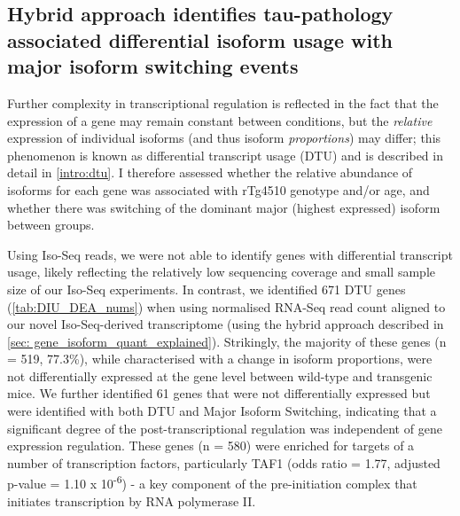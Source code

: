 \clearpage
\subsection{Hybrid approach identifies tau-pathology associated differential isoform usage with major isoform switching events}
Further complexity in transcriptional regulation is reflected in the fact that the expression of a gene may remain constant between conditions, but the \textit{relative} expression of individual isoforms (and thus isoform \textit{proportions}) may differ; this phenomenon is known as differential transcript usage (DTU) and is described in detail in \cref{intro:dtu}. I therefore assessed whether the relative abundance of isoforms for each gene was associated with rTg4510 genotype and/or age, and whether there was switching of the dominant major (highest expressed) isoform between groups. 

Using Iso-Seq reads, we were not able to identify genes with differential transcript usage, likely reflecting the relatively low sequencing coverage and small sample size of our Iso-Seq experiments. In contrast, we identified 671 DTU genes (\cref{tab:DIU_DEA_nums}) when using normalised RNA-Seq read count aligned to our novel Iso-Seq-derived transcriptome (using the hybrid approach described in \cref{sec: gene_isoform_quant_explained}). Strikingly, the majority of these genes (n = 519, 77.3\%), while characterised with a change in isoform proportions, were not differentially expressed at the gene level between wild-type and transgenic mice. We further identified 61 genes that were not differentially expressed but were identified with both DTU and Major Isoform Switching, indicating that a significant degree of the post-transcriptional regulation was independent of gene expression regulation. These genes (n = 580) were enriched for targets of a number of transcription factors, particularly TAF1 (odds ratio = 1.77, adjusted p-value = 1.10 x 10\textsuperscript{-6}) - a key component of the pre-initiation complex that initiates transcription by RNA polymerase II\cite{Bieniossek2013}. 

